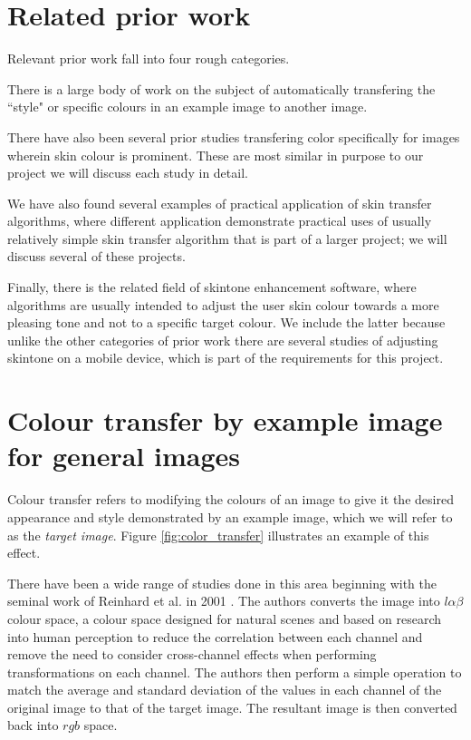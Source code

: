 \section{Related prior work}

Relevant prior work fall into four rough categories. 

There is a large body of work on the subject of automatically transfering the ``style" or specific colours in an example image to another image.

There have also been several prior studies transfering color specifically for images wherein skin colour is prominent. These are most similar in purpose to our project we will discuss each study in detail.

We have also found several examples of practical application of skin transfer algorithms, where different application demonstrate practical uses of usually relatively simple skin transfer algorithm that is part of a larger project; we will discuss several of these projects. 

Finally, there is the related field of skintone enhancement software, where algorithms are usually intended to adjust the user skin colour towards a more pleasing tone and not to a specific target colour. We include the latter because unlike the other categories of prior work there are several studies of adjusting skintone on a mobile device, which is part of the requirements for this project.

\section{Colour transfer by example image for general images}
Colour transfer refers to modifying the colours of an image to give it the desired appearance and style demonstrated by an example image, which we will refer to as the \textit{target image}. Figure \ref{fig:color_transfer} illustrates an example of this effect.

There have been a wide range of studies done in this area beginning with the seminal work of Reinhard et al. in 2001 \cite{reinhard_2001_transfer}. The authors converts the image into $l\alpha\beta$ colour space, a colour space designed for natural scenes and based on research into human perception to reduce the correlation between each channel and remove the need to consider cross-channel effects when performing transformations on each channel. The authors then perform a simple operation to match the average and standard deviation of the values in each channel of the original image to that of the target image. The resultant image is then converted back into $rgb$ space.

